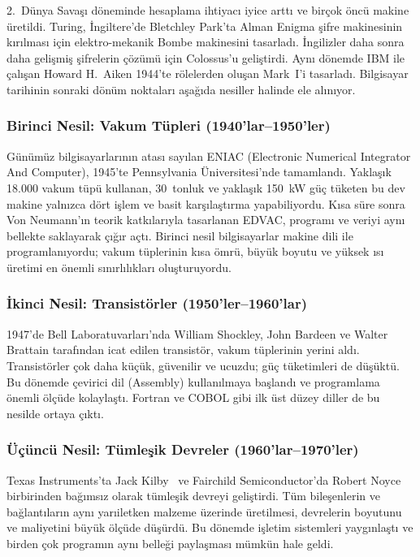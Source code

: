 2.~Dünya Savaşı döneminde hesaplama ihtiyacı iyice arttı ve birçok öncü makine üretildi. Turing, İngiltere'de Bletchley Park'ta Alman Enigma şifre makinesinin kırılması için elektro-mekanik Bombe makinesini tasarladı. İngilizler daha sonra daha gelişmiş şifrelerin çözümü için Colossus'u geliştirdi. Aynı dönemde IBM ile çalışan Howard H.~Aiken 1944'te rölelerden oluşan Mark~I'i tasarladı. Bilgisayar tarihinin sonraki dönüm noktaları aşağıda nesiller halinde ele alınıyor.

\subsubsection*{Birinci Nesil: Vakum Tüpleri (1940'lar--1950'ler)}
Günümüz bilgisayarlarının atası sayılan ENIAC (Electronic Numerical Integrator And Computer), 1945'te Pennsylvania Üniversitesi'nde tamamlandı. Yaklaşık 18.000 vakum tüpü kullanan, 30~tonluk ve yaklaşık 150~kW güç tüketen bu dev makine yalnızca dört işlem ve basit karşılaştırma yapabiliyordu. Kısa süre sonra Von Neumann'ın teorik katkılarıyla tasarlanan EDVAC, programı ve veriyi aynı bellekte saklayarak çığır açtı. Birinci nesil bilgisayarlar makine dili ile programlanıyordu; vakum tüplerinin kısa ömrü, büyük boyutu ve yüksek ısı üretimi en önemli sınırlılıkları oluşturuyordu.

\subsubsection*{İkinci Nesil: Transistörler (1950'ler--1960'lar)}
1947'de Bell Laboratuvarları'nda William Shockley, John Bardeen ve Walter Brattain tarafından icat edilen transistör, vakum tüplerinin yerini aldı. Transistörler çok daha küçük, güvenilir ve ucuzdu; güç tüketimleri de düşüktü. Bu dönemde çevirici dil (Assembly) kullanılmaya başlandı ve programlama önemli ölçüde kolaylaştı. Fortran ve COBOL gibi ilk üst düzey diller de bu nesilde ortaya çıktı.

\subsubsection*{Üçüncü Nesil: Tümleşik Devreler (1960'lar--1970'ler)}
Texas Instruments'ta Jack Kilby~\cite{kilby1964} ve Fairchild Semiconductor'da Robert Noyce birbirinden bağımsız olarak tümleşik devreyi geliştirdi. Tüm bileşenlerin ve bağlantıların aynı yarıiletken malzeme üzerinde üretilmesi, devrelerin boyutunu ve maliyetini büyük ölçüde düşürdü. Bu dönemde işletim sistemleri yaygınlaştı ve birden çok programın aynı belleği paylaşması mümkün hale geldi.

